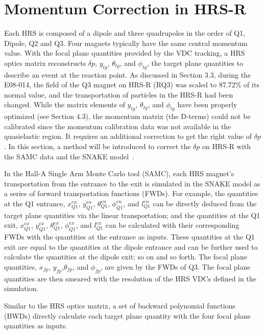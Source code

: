 \chapter{Momentum Correction in HRS-R}
  Each HRS is composed of a dipole and three quadrupoles in the order of Q1, Dipole, Q2 and Q3. Four magnets typically have the same central momentum value. With the focal plane quantities provided by the VDC tracking, a HRS optics matrix reconstructs $\delta p$, $y_{tg}$, $\theta_{tg}$, and $\phi_{tg}$, the target plane quantities to describe an event at the reaction point. As discussed in Section 3.3, during the E08-014, the field of the Q3 magnet on HRS-R (RQ3) was scaled to 87.72\% of its normal value, and the transportation of particles in the HRS-R had been changed. While the matrix elements of $y_{tg}$, $\theta_{tg}$, and $\phi_{tg}$ have been properly optimized (see Section 4.3), the momentum matrix (the D-terms) could not be calibrated since the momentum calibration data was not available in the quasielastic region. It requires an additional correction to get the right value of $\delta p$. In this section, a method will be introduced to correct the $\delta p$ on HRS-R with the SAMC data and the SNAKE model~\cite{snack_lerose}.
 
 In the Hall-A Single Arm Monte Carlo tool (SAMC), each HRS magnet's transportation from the entrance to the exit is simulated in the SNAKE model as a series of forward transportation functions (FWDs). For example, the quantities at the Q1 entrance, $x_{Q1}^{en}$, $y_{Q1}^{en}$, $\theta_{Q1}^{en}$, $\phi_{Q1}^{en}$, and $l_{Q1}^{en}$ can be directly deduced from the target plane quantities via the linear transportation; and the quantities at the Q1 exit, $x_{Q1}^{ex}$, $y_{Q1}^{ex}$, $\theta_{Q1}^{ex}$, $\phi_{Q1}^{ex}$, and $l_{Q1}^{ex}$ can be calculated with their corresponding FWDs with the quantities at the entrance as inputs. These quantities at the Q1 exit are equal to the quantities at the dipole entrance and can be further used to calculate the quantities at the dipole exit; so on and so forth. The focal plane quantities, $x_{fp}$, $y_{fp}$,$\theta_{fp}$, and $\phi_{fp}$, are given by the FWDs of Q3. The focal plane quantities are then smeared with the resolution of the HRS VDCs defined in the simulation.
 
  Similar to the HRS optics matrix, a set of backward polynomial functions (BWDs) directly calculate each target plane quantity with the four focal plane quantities as inputs.
  
